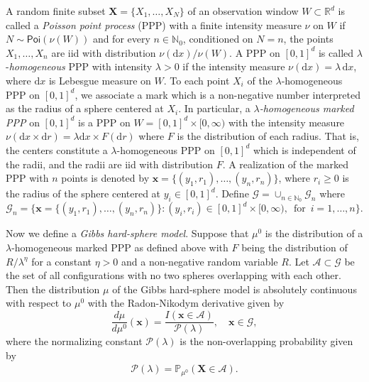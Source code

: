 \documentclass[11pt]{article}
\newcommand{\pp}{\mathbb{P}}
\newcommand{\dd}{\mathrm{d}}
\newcommand{\reals}{\mathbb{R}}
\newcommand{\mbb}{\mathbb}
\newcommand{\lt}{\left}
\newcommand{\rt}{\right}
\newcommand{\pois}{\mathsf{Poi}}
\newcommand{\pno}{\mathcal{P}(\lambda)}
\newcommand{\lfs}{\mathbf{x}}
\newcommand{\state}{\mathbf{X}}
\begin{document}
A random finite subset $\state = \{X_1, \dots, X_N\}$ of an observation window $W \subset \reals^d$ is called a {\em Poisson point process} (PPP) with a finite intensity measure $\nu$ on $W$ if $N \sim \pois(\nu(W))$ and for every $n \in \mbb{N}_0$, conditioned on $N = n$, the points $X_1, \dots, X_n$ are iid with distribution $\nu(\dd x)/ \nu(W)$. A PPP  on $[0,1]^d$ is called $\lambda$-{\it homogeneous} PPP with intensity $\lambda > 0$ if the intensity measure $\nu(\dd x) = \lambda\, \dd x$,  {where $\dd x$ is Lebesgue measure on $W$.}
To each point $X_i$ of the $\lambda$-homogeneous PPP on $[0,1]^d$, we associate a mark  {which is a non-negative number interpreted as the radius of }a sphere centered at $X_i$.
In particular, a {\it $\lambda$-homogeneous marked  PPP} on $[0,1]^d$ is a PPP on $W = [0,1]^d \times [0, \infty)$ with the intensity measure ${\nu(\dd x \times \dd r) = \lambda \dd x \times F(\dd r)}$ where $F$ is the distribution of each radius. That is, the centers constitute a $\lambda$-homogeneous PPP on $[0,1]^d$ which is independent of the radii, and the radii are iid with distribution $F$. A realization of the marked PPP with $n$ points is denoted by $\lfs = \{(y_1, r_1), \dots, (y_n, r_n)\}$, where $r_i \geq 0$ is the radius of the sphere centered at $y_i \in [0,1]^d$. Define $\mathscr{G} = \cup_{n \in \mbb{N}_0}\mathscr{G}_n$ where
\[
\mathscr{G}_n = \big\{ \lfs = \{(y_1, r_1), \dots, (y_n, r_n)\} :  (y_i, r_i) \in [0,1]^d\times [0, \infty),\, \text{ for }\, i = 1, \dots, n \big\}.
\]

Now we  {define a }{\em Gibbs hard-sphere model}. Suppose that $\mu^0$ is the distribution of a $\lambda$-homogeneous marked PPP as defined above with $F$ being the distribution of $R/\lambda^\eta$ for a constant $\eta > 0$ and a non-negative random variable $R$. Let $\mathscr{A} \subset \mathscr{G}$ be the set of all configurations with no two spheres overlapping with each other. Then the distribution $\mu$ of  the Gibbs hard-sphere model is absolutely continuous with respect to $\mu^0$ with the Radon-Nikodym derivative given by
\begin{equation}
 \label{eqn:dist_mu_HS}
  \frac{d\mu}{d\mu^0}(\lfs) = \frac{I\lt(\lfs \in \mathscr{A}\rt)}{\pno}, \quad \lfs \in \mathscr{G},
\end{equation}
where the normalizing constant $\pno$ is the non-overlapping probability given by
\begin{align}
 \label{eqn:non-overlap}
 \pno = \pp_{\mu^0} \lt( \state \in \mathscr{A} \rt).
\end{align}
\end{document}
